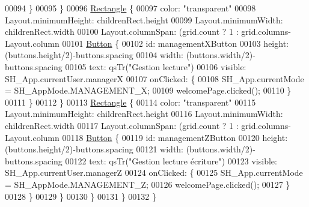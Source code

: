 \begin{DoxyCode}
00094                 \}
00095             \}
00096             \hyperlink{classRectangle}{Rectangle} \{
00097                 color: \textcolor{stringliteral}{"transparent"}
00098                 Layout.minimumHeight: childrenRect.height
00099                 Layout.minimumWidth: childrenRect.width
00100                 Layout.columnSpan: (grid.count%
      ? 1 : grid.columns-Layout.column
00101                 \hyperlink{classButton}{Button} \{
00102                     \textcolor{keywordtype}{id}: managementXButton
00103                     height: (buttons.height/2)-buttons.spacing
00104                     width: (buttons.width/2)-buttons.spacing
00105                     text: qsTr(\textcolor{stringliteral}{"Gestion lecture"})
00106                     visible: SH\_App.currentUser.managerX
00107                     onClicked: \{
00108                         SH\_App.currentMode = SH\_AppMode.MANAGEMENT\_X;
00109                         welcomePage.clicked();
00110                     \}
00111                 \}
00112             \}
00113             \hyperlink{classRectangle}{Rectangle} \{
00114                 color: \textcolor{stringliteral}{"transparent"}
00115                 Layout.minimumHeight: childrenRect.height
00116                 Layout.minimumWidth: childrenRect.width
00117                 Layout.columnSpan: (grid.count%
      ? 1 : grid.columns-Layout.column
00118                 \hyperlink{classButton}{Button} \{
00119                     \textcolor{keywordtype}{id}: managementZButton
00120                     height: (buttons.height/2)-buttons.spacing
00121                     width: (buttons.width/2)-buttons.spacing
00122                     text: qsTr(\textcolor{stringliteral}{"Gestion lecture écriture"})
00123                     visible: SH\_App.currentUser.managerZ
00124                     onClicked: \{
00125                         SH\_App.currentMode = SH\_AppMode.MANAGEMENT\_Z;
00126                         welcomePage.clicked();
00127                     \}
00128                 \}
00129             \}
00130         \}
00131     \}
00132 \}
\end{DoxyCode}
